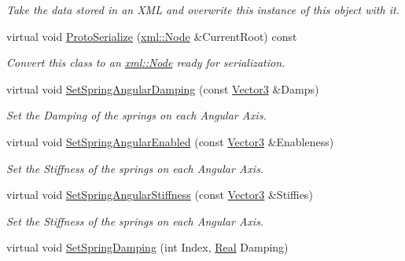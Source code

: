 \begin{DoxyCompactItemize}
\begin{DoxyCompactList}\small\item\em Take the data stored in an XML and overwrite this instance of this object with it. \item\end{DoxyCompactList}\item 
virtual void \hyperlink{classphys_1_1Generic6DofSpringConstraint_aeffb182d5faa82175e96a259fc19f9ff}{ProtoSerialize} (\hyperlink{classphys_1_1xml_1_1Node}{xml::Node} \&CurrentRoot) const 
\begin{DoxyCompactList}\small\item\em Convert this class to an \hyperlink{classphys_1_1xml_1_1Node}{xml::Node} ready for serialization. \item\end{DoxyCompactList}\item 
virtual void \hyperlink{classphys_1_1Generic6DofSpringConstraint_a65dbf1070a4277dd0d27e48db2b45c89}{SetSpringAngularDamping} (const \hyperlink{classphys_1_1Vector3}{Vector3} \&Damps)
\begin{DoxyCompactList}\small\item\em Set the Damping of the springs on each Angular Axis. \item\end{DoxyCompactList}\item 
virtual void \hyperlink{classphys_1_1Generic6DofSpringConstraint_a1f861c64cc9d4918bd3dbe606894422e}{SetSpringAngularEnabled} (const \hyperlink{classphys_1_1Vector3}{Vector3} \&Enableness)
\begin{DoxyCompactList}\small\item\em Set the Stiffness of the springs on each Angular Axis. \item\end{DoxyCompactList}\item 
virtual void \hyperlink{classphys_1_1Generic6DofSpringConstraint_ab1d57e737c3471acd9a9481abb9ac612}{SetSpringAngularStiffness} (const \hyperlink{classphys_1_1Vector3}{Vector3} \&Stiffies)
\begin{DoxyCompactList}\small\item\em Set the Stiffness of the springs on each Angular Axis. \item\end{DoxyCompactList}\item 
virtual void \hyperlink{classphys_1_1Generic6DofSpringConstraint_a5e39d3b9601b1d8ec6e3197b1cc999a7}{SetSpringDamping} (int Index, \hyperlink{namespacephys_af7eb897198d265b8e868f45240230d5f}{Real} Damping)

\end{DoxyCompactItemize}
